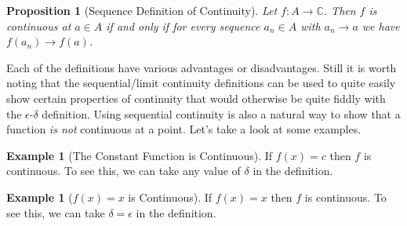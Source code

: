 \documentclass[11pt, a4paper]{article}
\newtheorem{proposition}[theorem]{Proposition}
\theoremstyle{definition}
\newtheorem{example}[theorem]{Example}
\newcommand{\C}{\mathbb{C}}
\begin{document}
\begin{proposition}[Sequence Definition of Continuity]
	Let $f : A \rightarrow \C$. Then $f$ is continuous at $a \in A$ if and only if for every sequence $a_n \in A$ with $a_n \rightarrow a$ we have $f(a_n) \rightarrow f(a)$.
\end{proposition}


Each of the definitions have various advantages or disadvantages.
Still it is worth noting that the sequential/limit continuity definitions can be used to quite easily show certain properties of continuity that would otherwise be quite fiddly with the $\epsilon$-$\delta$ definition. Using sequential continuity is also a natural way to show that a function \emph{is not} continuous at a point.
Let's take a look at some examples.

\begin{example}[The Constant Function is Continuous]
	If $f(x) = c$ then $f$ is continuous. To see this, we can take any value of $\delta$ in the definition.
	\end{example}

\begin{example}[$f(x) = x$ is Continuous]
	If $f(x) = x$ then $f$ is continuous. To see this, we can take $\delta = \epsilon$ in the definition.
	\end{example}
\end{document}
